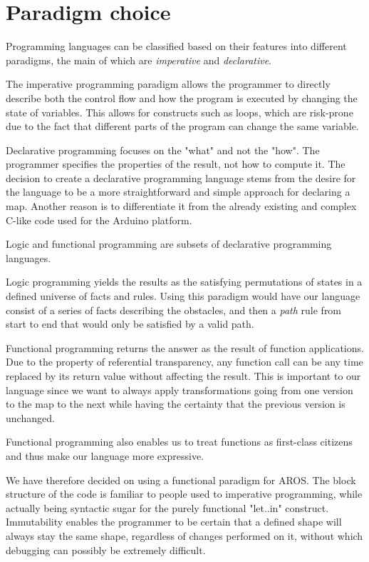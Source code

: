 \section{Paradigm choice}

Programming languages can be classified based on their features into different paradigms, the main of which are \textit{imperative} and \textit{declarative}.
\par
The imperative programming paradigm allows the programmer to directly describe both the control flow and how the program is executed by changing the state of variables. This allows for constructs such as loops, which are risk-prone due to the fact that different parts of the program can change the same variable.
\par
Declarative programming focuses on the "what" and not the "how". The programmer specifies the properties of the result, not how to compute it. The decision to create a declarative programming language stems from the desire for the language to be a more straightforward and simple approach for declaring a map. Another reason is to differentiate it from the already existing and complex C-like code used for the Arduino platform.
\par
Logic and functional programming are subsets of declarative programming languages.
\par
Logic programming yields the results as the satisfying permutations of states in a defined universe of facts and rules. Using this paradigm would have our language consist of a series of facts describing the obstacles, and then a \textit{path} rule from start to end that would only be satisfied by a valid path.
\par
Functional programming returns the answer as the result of function applications. Due to the property of referential transparency, any function call can be any time replaced by its return value without affecting the result. This is important to our language since we want to always apply transformations going from one version to the map to the next while having the certainty that the previous version is unchanged.
\par
Functional programming also enables us to treat functions as first-class citizens and thus make our language more expressive.
\par
We have therefore decided on using a functional paradigm for AROS. The block structure of the code is familiar to people used to imperative programming, while actually being syntactic sugar for the purely functional "let..in" construct. Immutability enables the programmer to be certain that a defined shape will always stay the same shape, regardless of changes performed on it, without which debugging can possibly be extremely difficult.